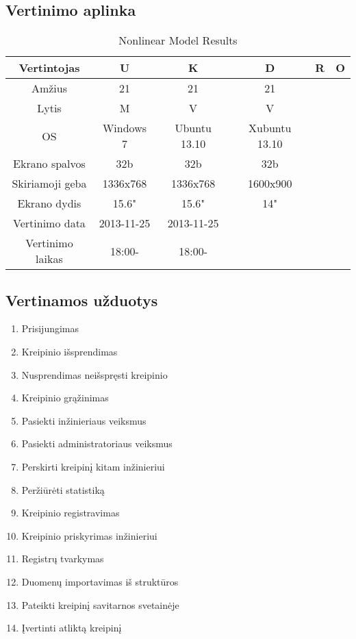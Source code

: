 \subsection{Vertinimo aplinka}
	\begin{table}[ht] 
	\caption{Nonlinear Model Results} %
	\centering %
	\begin{tabular}{c c c c c c} %
	\hline\hline %
	Vertintojas & U & K & D & R & O \\ [0.5ex] %
	\hline %
	Amžius & 21 & 21 & 21\\ %
	Lytis & M & V & V\\
	OS & Windows 7 & Ubuntu 13.10 & Xubuntu 13.10\\
	Ekrano spalvos & 32b & 32b & 32b\\
	Skiriamoji geba & 1336x768 & 1336x768 & 1600x900\\
	Ekrano dydis & 15.6" & 15.6" & 14"\\
	Vertinimo data & 2013-11-25 & 2013-11-25\\
	Vertinimo laikas & 18:00- & 18:00-\\
	\hline %
	\end{tabular} 
	\label{table:aplinka} %
	\end{table} 
	
\subsection{Vertinamos užduotys}
	\begin{enumerate}
	\item Prisijungimas
	\item Kreipinio išsprendimas
	\item Nusprendimas neišspręsti kreipinio
	\item Kreipinio grąžinimas
	\item Pasiekti inžinieriaus veiksmus
	\item Pasiekti administratoriaus veiksmus
	\item Perskirti kreipinį kitam inžinieriui
	\item Peržiūrėti statistiką
	\item Kreipinio registravimas
	\item Kreipinio priskyrimas inžinieriui
	\item Registrų tvarkymas
	\item Duomenų importavimas iš struktūros
	\item Pateikti kreipinį savitarnos svetainėje
	\item Įvertinti atliktą kreipinį
	\end{enumerate}
	
